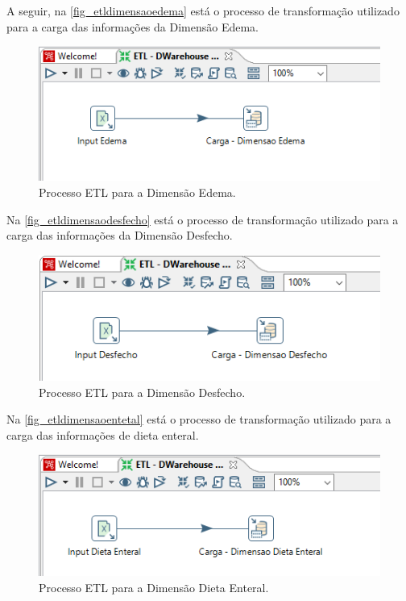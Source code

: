 A seguir, na \autoref{fig_etldimensaoedema} está o processo de transformação utilizado para a carga das informações da Dimensão Edema.
\begin{figure}[htb]
	\caption{\label{fig_etldimensaoedema}Processo ETL para a Dimensão Edema.}
	\begin{center}
	    \includegraphics[scale=0.7]{Imagens/figura - etl dw edema.png}
	\end{center}
\end{figure}

Na \autoref{fig_etldimensaodesfecho} está o processo de transformação utilizado para a carga das informações da Dimensão Desfecho.
\begin{figure}[htb]
	\caption{\label{fig_etldimensaodesfecho}Processo ETL para a Dimensão Desfecho.}
	\begin{center}
	    \includegraphics[scale=0.75]{Imagens/figura - etl dw desfecho.png}
	\end{center}
\end{figure}

Na \autoref{fig_etldimensaoentetal} está o processo de transformação utilizado para a carga das informações de dieta enteral.
\begin{figure}[htb]
	\caption{\label{fig_etldimensaoentetal}Processo ETL para a Dimensão Dieta Enteral.}
	\begin{center}
	    \includegraphics[scale=0.75]{Imagens/figura - etl dw dietaenteral.png}
	\end{center}
\end{figure}

